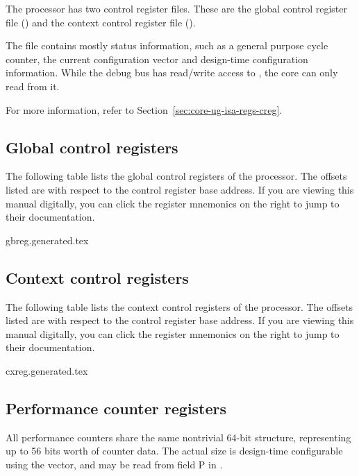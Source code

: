 
\label{sec:core-ug-creg}

The \rvex{} processor has two control register files. These are the global 
control register file () and the context control register file 
().

The  file contains mostly status information, such as a general 
purpose cycle counter, the current configuration vector and design-time 
configuration information. While the debug bus has read/write access to 
, the core can only read from it.

For more information, refer to Section~\ref{sec:core-ug-isa-regs-creg}.

\subsection{Global control registers}
\label{sec:core-ug-creg-gb}

The following table lists the global control registers of the \rvex{} processor. 
The offsets listed are with respect to the control register base address. If you 
are viewing this manual digitally, you can click the register mnemonics on the 
right to jump to their documentation.

{gbreg.generated.tex}

\subsection{Context control registers}
\label{sec:core-ug-creg-cx}

The following table lists the context control registers of the \rvex{} 
processor. The offsets listed are with respect to the control register base 
address. If you are viewing this manual digitally, you can click the register 
mnemonics on the right to jump to their documentation.

{cxreg.generated.tex}

\subsection{Performance counter registers}
\label{sec:core-ug-creg-perf}

All performance counters share the same nontrivial 64-bit structure,
representing up to 56 bits worth of counter data. The actual size is design-time
configurable using the  vector, and may be read from field P in
.

